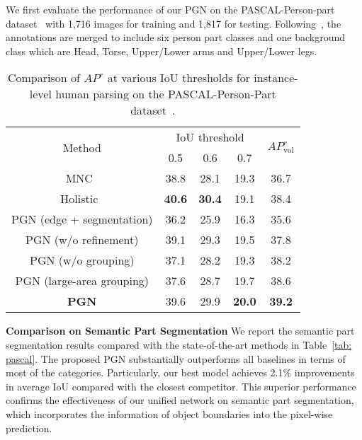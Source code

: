 \documentclass[runningheads]{llncs}
\begin{document}
We first evaluate the performance of our PGN on the PASCAL-Person-part dataset~\cite{chen2014detect} with 1,716 images for training and 1,817 for testing. Following~\cite{chen2015attention,xia2015zoom}, the annotations are merged to include six person part classes and one background class which are Head, Torse, Upper/Lower arms and Upper/Lower legs. 



\begin{table}[t]
\centering
\small
\caption{Comparison of $AP^r$ at various IoU thresholds for instance-level human parsing on the PASCAL-Person-Part dataset~\cite{chen2014detect}.}
\tabcolsep 0.15in 
\begin{tabular}{ccccc}
\toprule[0.7pt]
\multirow{2}{*}{Method}        & \multicolumn{3}{c}{IoU threshold}   &  \multirow{2}{*}{$AP^r_\text{vol}$}   \\     
                               & 0.5           & 0.6           &  0.7          &                  \\ \hline
MNC~\cite{Dai_2016_CVPR}       & 38.8          & 28.1          & 19.3          & 36.7             \\
Holistic~\cite{li2017holistic} & \textbf{40.6} & \textbf{30.4} & 19.1          & 38.4             \\  \hline
PGN (edge + segmentation)      & 36.2          & 25.9          & 16.3          & 35.6             \\
PGN (w/o refinement)           & 39.1          & 29.3          & 19.5          & 37.8             \\  
PGN (w/o grouping)             & 37.1          & 28.2          & 19.3          & 38.2             \\
PGN (large-area grouping)      & 37.6          & 28.7          & 19.7          & 38.6             \\     \hline
\textbf{PGN}                   & 39.6          & 29.9          & \textbf{20.0} & \textbf{39.2}    \\
\toprule[0.7pt]
\end{tabular}
\vspace{-8mm}
\label{tab: instance_pascal}
\end{table}


\textbf{Comparison on Semantic Part Segmentation} 
We report the semantic part segmentation results compared with the state-of-the-art methods in Table~\ref{tab: pascal}. The proposed PGN substantially outperforms all baselines in terms of most of the categories. Particularly, our best model achieves 2.1\% improvements in average IoU compared with the closest competitor. This superior performance confirms the effectiveness of our unified network on semantic part segmentation, which incorporates the information of object boundaries into the pixel-wise prediction.
\end{document}
